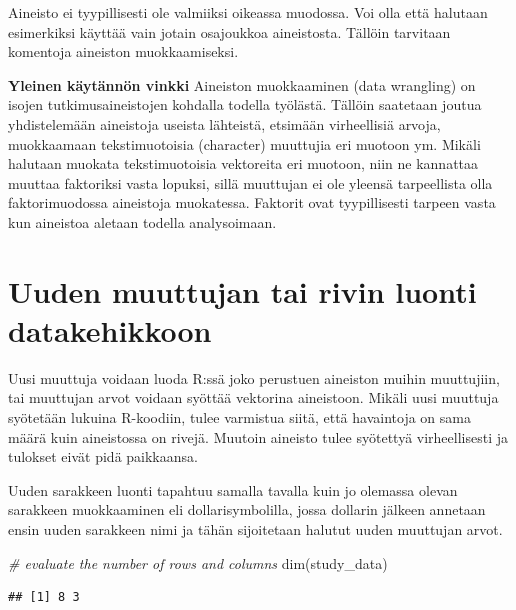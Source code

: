 \documentclass[
]{book}
\newenvironment{Shaded}{\begin{snugshade}}{\end{snugshade}}
\newcommand{\CommentTok}[1]{\textcolor[rgb]{0.56,0.35,0.01}{\textit{#1}}}
\newcommand{\FunctionTok}[1]{\textcolor[rgb]{0.00,0.00,0.00}{#1}}
\newcommand{\NormalTok}[1]{#1}
\begin{document}
Aineisto ei tyypillisesti ole valmiiksi oikeassa muodossa. Voi olla että halutaan esimerkiksi käyttää vain jotain osajoukkoa aineistosta. Tällöin tarvitaan komentoja aineiston muokkaamiseksi.

\textbf{Yleinen käytännön vinkki}
Aineiston muokkaaminen (data wrangling) on isojen tutkimusaineistojen kohdalla todella työlästä. Tällöin saatetaan joutua yhdistelemään aineistoja useista lähteistä, etsimään virheellisiä arvoja, muokkaamaan tekstimuotoisia (character) muuttujia eri muotoon ym. Mikäli halutaan muokata tekstimuotoisia vektoreita eri muotoon, niin ne kannattaa muuttaa faktoriksi vasta lopuksi, sillä muuttujan ei ole yleensä tarpeellista olla faktorimuodossa aineistoja muokatessa. Faktorit ovat tyypillisesti tarpeen vasta kun aineistoa aletaan todella analysoimaan.

\hypertarget{data-frame-wrangling}{%
\section{Uuden muuttujan tai rivin luonti datakehikkoon}\label{data-frame-wrangling}}

Uusi muuttuja voidaan luoda R:ssä joko perustuen aineiston muihin muuttujiin, tai muuttujan arvot voidaan syöttää vektorina aineistoon. Mikäli uusi muuttuja syötetään lukuina R-koodiin, tulee varmistua siitä, että havaintoja on sama määrä kuin aineistossa on rivejä. Muutoin aineisto tulee syötettyä virheellisesti ja tulokset eivät pidä paikkaansa.

Uuden sarakkeen luonti tapahtuu samalla tavalla kuin jo olemassa olevan sarakkeen muokkaaminen eli dollarisymbolilla, jossa dollarin jälkeen annetaan ensin uuden sarakkeen nimi ja tähän sijoitetaan halutut uuden muuttujan arvot.

\begin{Shaded}
\begin{Highlighting}[]
\CommentTok{\# evaluate the number of rows and columns}
\FunctionTok{dim}\NormalTok{(study\_data)}
\end{Highlighting}
\end{Shaded}

\begin{verbatim}
## [1] 8 3
\end{verbatim}
\end{document}
